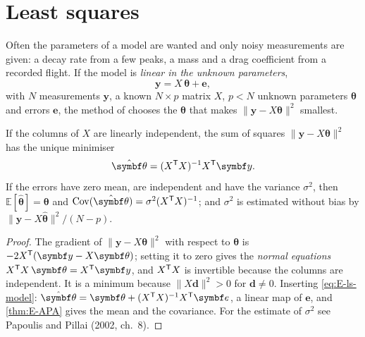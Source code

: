
\section{Least squares}

Often the parameters of a model are wanted and only noisy measurements are given: a decay rate from a few peaks, a mass and a drag coefficient from a recorded flight. If the model is \emph{linear in the unknown parameters},
\begin{equation}\label{eq:E-ls-model}
  \symbf y = X\,\symbf\theta + \symbf e ,
\end{equation}
with $N$ measurements $\symbf y$, a known $N \times p$ matrix $X$, $p < N$ unknown parameters $\symbf\theta$ and errors $\symbf e$, the method of  chooses the $\symbf\theta$ that makes $\|\symbf y - X\symbf\theta\|^2$ smallest.

\begin{theorem}
\label{thm:E-ls}
If the columns of $X$ are linearly independent, the sum of squares $\|\symbf y - X\symbf\theta\|^2$ has the unique minimiser
\begin{equation}\label{eq:E-ls}
  \hat{\symbf\theta} = (X^\T X)^{-1}X^\T\symbf y .
\end{equation}
If the errors have zero mean, are independent and have the variance $\sigma^2$, then $\mathbb{E}[\hat{\symbf\theta}] = \symbf\theta$ and $\operatorname{Cov}(\hat{\symbf\theta}) = \sigma^2(X^\T X)^{-1}$; and $\sigma^2$ is estimated without bias by $\|\symbf y - X\hat{\symbf\theta}\|^2/(N - p)$.
\end{theorem}
\begin{proof}
The gradient of $\|\symbf y - X\symbf\theta\|^2$ with respect to $\symbf\theta$ is $-2X^\T(\symbf y - X\symbf\theta)$; setting it to zero gives the \emph{normal equations} $X^\T X\,\symbf\theta = X^\T\symbf y$, and $X^{\mathsf{T}} X$ is invertible because the columns are independent. It is a minimum because $\|X\symbf d\|^2 > 0$ for $\symbf d \ne 0$. Inserting \cref{eq:E-ls-model}: $\hat{\symbf\theta} = \symbf\theta + (X^\T X)^{-1}X^\T\symbf e$, a linear map of $\symbf e$, and \cref{thm:E-APA} gives the mean and the covariance. For the estimate of $\sigma^2$ see Papoulis and Pillai (2002, ch.~8).
\end{proof}


